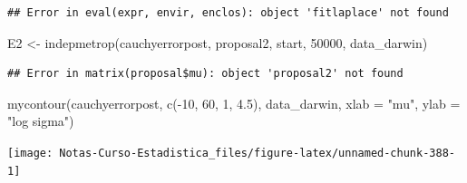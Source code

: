 \documentclass[
  12pt,
]{book}
\newenvironment{Shaded}{\begin{snugshade}}{\end{snugshade}}
\newcommand{\AttributeTok}[1]{\textcolor[rgb]{0.77,0.63,0.00}{#1}}
\newcommand{\DecValTok}[1]{\textcolor[rgb]{0.00,0.00,0.81}{#1}}
\newcommand{\FloatTok}[1]{\textcolor[rgb]{0.00,0.00,0.81}{#1}}
\newcommand{\FunctionTok}[1]{\textcolor[rgb]{0.00,0.00,0.00}{#1}}
\newcommand{\NormalTok}[1]{#1}
\newcommand{\OtherTok}[1]{\textcolor[rgb]{0.56,0.35,0.01}{#1}}
\newcommand{\SpecialCharTok}[1]{\textcolor[rgb]{0.00,0.00,0.00}{#1}}
\newcommand{\StringTok}[1]{\textcolor[rgb]{0.31,0.60,0.02}{#1}}
\theoremstyle{definition}
\theoremstyle{definition}
\theoremstyle{definition}
\theoremstyle{definition}
\theoremstyle{remark}
\begin{document}
\begin{Shaded}
\end{Shaded}

\begin{verbatim}
## Error in eval(expr, envir, enclos): object 'fitlaplace' not found
\end{verbatim}

\begin{Shaded}
\begin{Highlighting}[]
\NormalTok{E2 }\OtherTok{\textless{}{-}} \FunctionTok{indepmetrop}\NormalTok{(cauchyerrorpost, proposal2, start,}
    \DecValTok{50000}\NormalTok{, data\_darwin)}
\end{Highlighting}
\end{Shaded}

\begin{verbatim}
## Error in matrix(proposal$mu): object 'proposal2' not found
\end{verbatim}

\begin{Shaded}
\begin{Highlighting}[]
\FunctionTok{mycontour}\NormalTok{(cauchyerrorpost, }\FunctionTok{c}\NormalTok{(}\SpecialCharTok{{-}}\DecValTok{10}\NormalTok{, }\DecValTok{60}\NormalTok{, }\DecValTok{1}\NormalTok{, }\FloatTok{4.5}\NormalTok{), data\_darwin,}
    \AttributeTok{xlab =} \StringTok{"mu"}\NormalTok{, }\AttributeTok{ylab =} \StringTok{"log sigma"}\NormalTok{)}
\end{Highlighting}
\end{Shaded}

\begin{center}\texttt{[image: Notas-Curso-Estadistica\_files/figure-latex/unnamed-chunk-388-1]} \end{center}

\begin{Shaded}
\end{Shaded}
\end{document}
